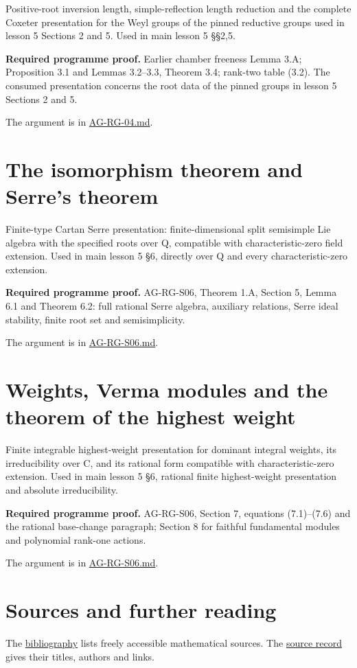 \documentclass[11pt,a4paper,openany]{report}
\begin{document}
Positive-root inversion length, simple-reflection length reduction and the complete Coxeter presentation for the Weyl groups of the pinned reductive groups used in lesson 5 Sections 2 and 5. Used in main lesson 5 §§2,5.

\textbf{Required programme proof.} Earlier chamber freeness Lemma 3.A; Proposition 3.1 and Lemmas 3.2--3.3, Theorem 3.4; rank-two table (3.2). The consumed presentation concerns the root data of the pinned groups in lesson 5 Sections 2 and 5.

The argument is in \href{https://github.com/KokunoYumeto/open-math-courses/blob/main/docs/courses/AG-RG/AG-RG-04.md}{AG-RG-04.md}.

\section{The isomorphism theorem and Serre's theorem}\label{the-isomorphism-theorem-and-serres-theorem}

Finite-type Cartan Serre presentation: finite-dimensional split semisimple Lie algebra with the specified roots over Q, compatible with characteristic-zero field extension. Used in main lesson 5 §6, directly over Q and every characteristic-zero extension.

\textbf{Required programme proof.} AG-RG-S06, Theorem 1.A, Section 5, Lemma 6.1 and Theorem 6.2: full rational Serre algebra, auxiliary relations, Serre ideal stability, finite root set and semisimplicity.

The argument is in \href{https://github.com/KokunoYumeto/open-math-courses/blob/main/docs/courses/AG-RG/AG-RG-S06.md}{AG-RG-S06.md}.

\section{Weights, Verma modules and the theorem of the highest weight}\label{weights-verma-modules-and-the-theorem-of-the-highest-weight}

Finite integrable highest-weight presentation for dominant integral weights, its irreducibility over C, and its rational form compatible with characteristic-zero extension. Used in main lesson 5 §6, rational finite highest-weight presentation and absolute irreducibility.

\textbf{Required programme proof.} AG-RG-S06, Section 7, equations (7.1)--(7.6) and the rational base-change paragraph; Section 8 for faithful fundamental modules and polynomial rank-one actions.

The argument is in \href{https://github.com/KokunoYumeto/open-math-courses/blob/main/docs/courses/AG-RG/AG-RG-S06.md}{AG-RG-S06.md}.

\section{Sources and further reading}\label{sources-and-further-reading}

The \href{references.html}{bibliography} lists freely accessible mathematical sources. The \href{SOURCES.json}{source record} gives their titles, authors and links.
\end{document}
